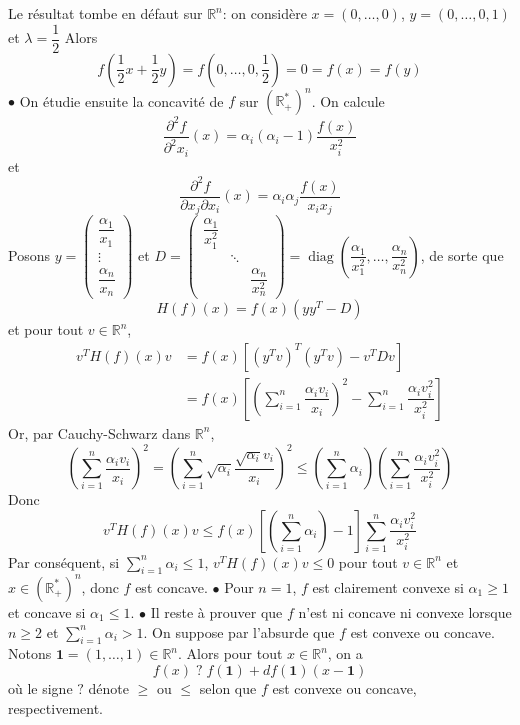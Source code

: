 \documentclass{fancybook}
\DeclareMathOperator{\diag}{diag}
\begin{document}
Le résultat tombe en défaut sur $\mathbb R^n$: on considère $x=(0,\ldots,0)$, $y=(0,\ldots,0,1)$ et $\lambda=\dfrac{1}{2}$ Alors $$f(\dfrac{1}{2}x + \dfrac{1}{2}y) = f(0,\ldots, 0,\dfrac{1}{2})=0 = f(x) = f(y)$$
$\bullet$ On étudie ensuite la concavité de $f$ sur $(\mathbb R_+^*)^n$.\newline
On calcule $$\dfrac{\partial^2 f}{\partial^2 x_i}(x) = \alpha_i(\alpha_i-1)\dfrac{f(x)}{x_i^2}$$
et $$\dfrac{\partial^2 f}{\partial x_j \partial x_i}(x) = \alpha_i \alpha_j\dfrac{f(x)}{x_i x_j}$$
Posons $y=\begin{pmatrix}
\dfrac{\alpha_1}{x_1}\\
\vdots\\
\dfrac{\alpha_n}{x_n}
\end{pmatrix}$ et $D=\begin{pmatrix}
\dfrac{\alpha_1}{x_1^2}\\
& \ddots \\
&& \dfrac{\alpha_n}{x_n^2}
\end{pmatrix}=\diag(\dfrac{\alpha_1}{x_1^2},\ldots,\dfrac{\alpha_n}{x_n^2})$, de sorte que 
$$H(f)(x)=f(x)(yy^T-D)$$ et pour tout $v\in \mathbb R^n$,
$$\begin{aligned} v^TH(f)(x)v &= f(x)[(y^Tv)^T(y^Tv)-v^TDv] \\
&= f(x) \left[\left(\sum_{i=1}^n \dfrac{\alpha_i v_i}{x_i}\right)^2 - \sum_{i=1}^n \dfrac{\alpha_i v_i^2}{x_i^2} \right]
\end{aligned}$$
Or, par Cauchy-Schwarz dans $\mathbb R^n$, 
$$\left(\sum_{i=1}^n\dfrac{\alpha_i v_i}{x_i} \right)^2 = \left(\sum_{i=1}^n \sqrt{\alpha_i}\dfrac{\sqrt{\alpha_i} v_i}{x_i} \right)^2 \leq \left(\sum_{i=1}^n \alpha_i \right) \left(\sum_{i=1}^n\dfrac{\alpha_i v_i^2}{x_i^2} \right)$$
Donc $$ v^TH(f)(x)v \leq f(x)\left[ \left(\sum_{i=1}^n \alpha_i\right) -1 \right]\sum_{i=1}^n\dfrac{\alpha_i v_i^2}{x_i^2}$$
Par conséquent, si $\displaystyle \sum_{i=1}^n \alpha_i \leq 1$, $v^TH(f)(x)v \leq 0$ pour tout $v\in \mathbb R^n$ et $x\in(\mathbb R_+^*)^n$, donc $f$ est concave. \newline 
\newline
$\bullet$ Pour $n=1$, $f$ est clairement convexe si $\alpha_1\geq 1$ et concave si $\alpha_1\leq 1 $.
\newline 
\newline
$\bullet$ Il reste à prouver que $f$ n'est ni concave ni convexe lorsque $n\geq 2$ et  $\displaystyle \sum_{i=1}^n \alpha_i > 1$. On suppose par l'absurde que $f$ est convexe ou concave. Notons $\mathbf{1}=(1,\ldots,1)\in \mathbb R^n$. Alors pour tout $x\in \mathbb R^n$, on a $$f(x) \;?\; f(\mathbf 1) + df(\mathbf 1)(x- \mathbf 1)$$ où le signe $?$ dénote $\geq$ ou $\leq$ selon que $f$ est convexe ou concave, respectivement.
\end{document}
